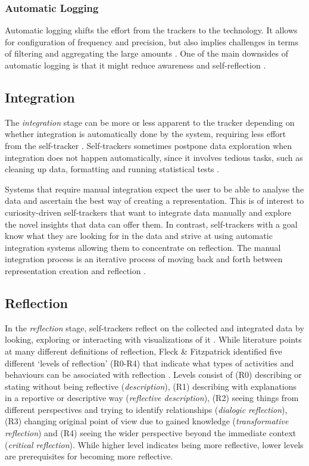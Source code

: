 \subsubsection{Automatic Logging}
Automatic logging shifts the effort from the trackers to the technology. It allows for configuration of frequency and precision, but also implies challenges in terms of filtering and aggregating the large amounts \cite{Muller}. One of the main downsides of automatic logging is that it might reduce awareness and self-reflection \cite{Choe2014, Li2011}.

\subsection{Integration}
The \textit{integration} stage can be more or less apparent to the tracker depending on whether integration is automatically done by the system, requiring less effort from the self-tracker \cite{Li2010}. Self-trackers sometimes postpone data exploration when integration does not happen automatically, since it involves tedious tasks, such as cleaning up data, formatting and running statistical tests \cite{Choe2014, Chung2015, Li2010}. 

Systems that require manual integration expect the user to be able to analyse the data and ascertain the best way of creating a representation. This is of interest to curiosity-driven self-trackers that want to integrate data manually and explore the novel insights that data can offer them. In contrast, self-trackers with a goal know what they are looking for in the data and strive at using automatic integration systems allowing them to concentrate on reflection. The manual integration process is an iterative process of moving back and forth between representation creation and reflection \cite{Whooley2014}. 

\subsection{Reflection}
In the \textit{reflection} stage, self-trackers reflect on the collected and integrated data by looking, exploring or interacting with visualizations of it \cite{Li2010}. While literature points at many different definitions of reflection, Fleck \& Fitzpatrick identified five different ‘levels of reflection’ (R0-R4) that indicate what types of activities and behaviours can be associated with reflection \cite{Fleck}. Levels consist of (R0) describing or stating without being reflective (\textit{description}), (R1) describing with explanations in a reportive or descriptive way (\textit{reflective description}), (R2) seeing things from different perspectives and trying to identify relationships (\textit{dialogic reflection}), (R3) changing original point of view due to gained knowledge (\textit{transformative reflection}) and (R4) seeing the wider perspective beyond the immediate context (\textit{critical reflection}). While higher level indicates being more reflective, lower levels are prerequisites for becoming more reflective. 

